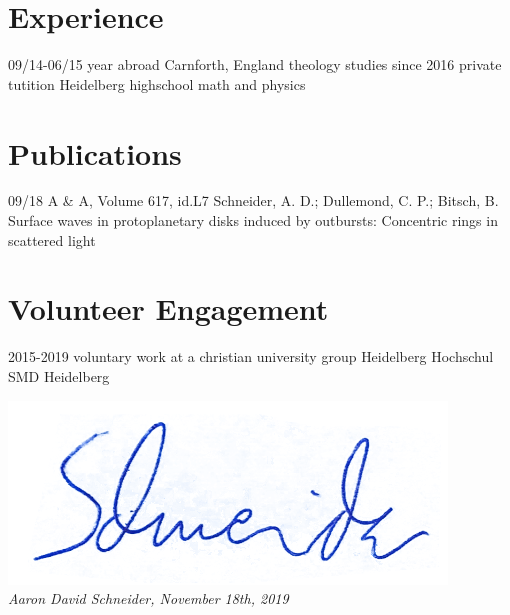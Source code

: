 \documentclass[]{friggeri-cv}
\begin{document}
\section{Experience}
\begin{entrylist}
	\entry
    {09/14-06/15}
    {year abroad}
    {Carnforth, England}
    {theology studies}
	\entry
    {since 2016}
    {private tutition}
    {Heidelberg}
    {highschool math and physics}

\end{entrylist}
\section{Publications}
\begin{entrylist}
  \entry
    {09/18}
    {A \& A, Volume 617, id.L7}
    {Schneider, A. D.; Dullemond, C. P.; Bitsch, B.}
    {Surface waves in protoplanetary disks induced by outbursts: Concentric rings in scattered light}
\end{entrylist}
\section{Volunteer Engagement}
\begin{entrylist}
  \entry
    {2015-2019}
    {voluntary work at a christian university group}
    {Heidelberg}
    {Hochschul SMD Heidelberg}
\end{entrylist}
\vspace{1.3cm}
\begin{flushright}
\includegraphics[width=.2\textwidth]{img/signature}\\
\emph{Aaron David Schneider, November 18th, 2019}
\end{flushright}
\clearpage
\end{document}
